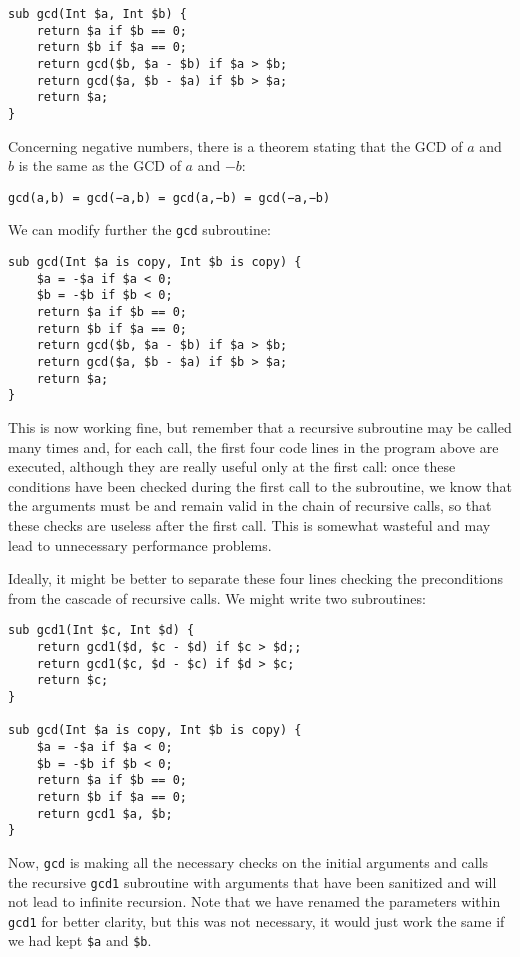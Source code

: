 \begin{verbatim}
sub gcd(Int $a, Int $b) { 
    return $a if $b == 0;
    return $b if $a == 0;
    return gcd($b, $a - $b) if $a > $b;
    return gcd($a, $b - $a) if $b > $a;
    return $a;
}
\end{verbatim}
%

Concerning negative numbers, there is a theorem stating that 
the GCD of $a$ and $b$ is the same as the GCD of $a$ and $-b$:

\begin{center}
{\tt gcd(a,b) = gcd(−a,b) = gcd(a,−b) = gcd(−a,−b)}
\end{center}
%

We can modify further the {\tt gcd} subroutine:

\begin{verbatim}
sub gcd(Int $a is copy, Int $b is copy) { 
    $a = -$a if $a < 0;
    $b = -$b if $b < 0;
    return $a if $b == 0;
    return $b if $a == 0;
    return gcd($b, $a - $b) if $a > $b;
    return gcd($a, $b - $a) if $b > $a;
    return $a;
}
\end{verbatim}
%

This is now working fine, but remember that a recursive 
subroutine may be called many times and, for each call,
the first four code lines in the program above are 
executed, although they are really useful only at the 
first call: once these conditions have been checked during 
the first call to the subroutine, we know that the 
arguments must be and remain valid in the chain of recursive 
calls, so that these checks are useless after the first call.
This is somewhat wasteful and may lead to unnecessary performance problems.

Ideally, it might be better to separate these four lines 
checking the preconditions from the cascade of recursive 
calls. We might write two subroutines:

\begin{verbatim}
sub gcd1(Int $c, Int $d) {
    return gcd1($d, $c - $d) if $c > $d;;
    return gcd1($c, $d - $c) if $d > $c;
    return $c;
}

sub gcd(Int $a is copy, Int $b is copy) { 
    $a = -$a if $a < 0;
    $b = -$b if $b < 0;
    return $a if $b == 0;
    return $b if $a == 0;
    return gcd1 $a, $b;
}
\end{verbatim}
%

Now, {\tt gcd} is making all the necessary checks on the 
initial arguments and calls the recursive {\tt gcd1} 
subroutine with arguments that have been sanitized and 
will not lead to infinite recursion. Note that we have 
renamed the parameters within {\tt gcd1} for better 
clarity, but this was not necessary, it would just work 
the same if we had kept {\tt \$a} and {\tt \$b}.

